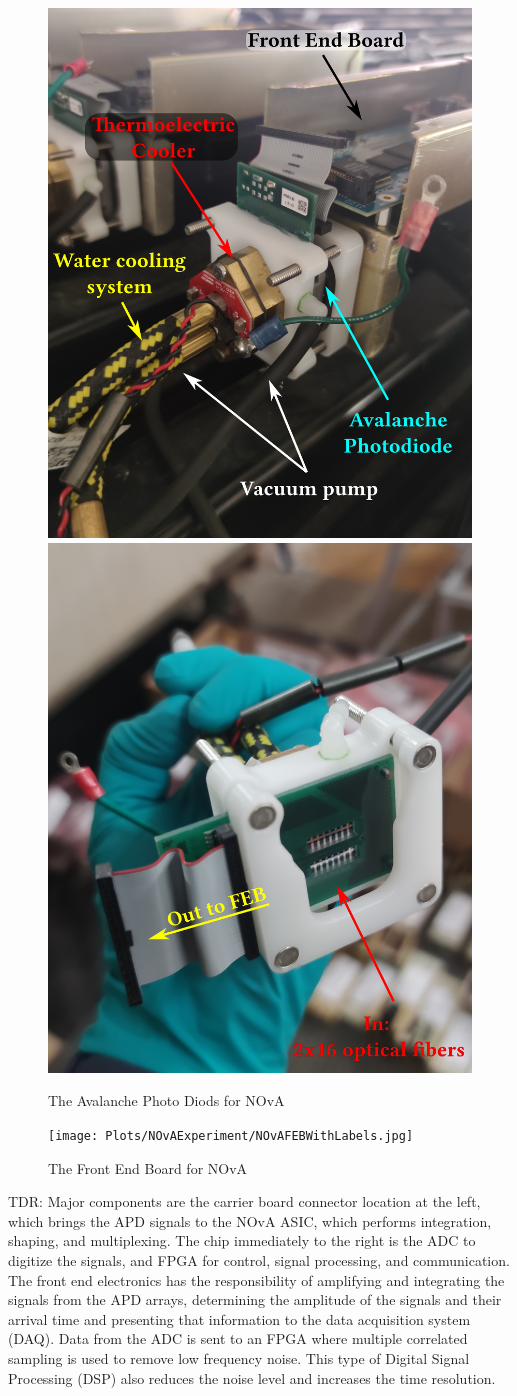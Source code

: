 \begin{figure}[!htb]  
  \centering
  \includegraphics*[width=.495\textwidth]{Plots/NOvAExperiment/NOvAAPDMountedWithLabels.jpg}
  \noindent\centering
  \includegraphics*[width=.495\textwidth]{Plots/NOvAExperiment/NOvAAPDBottomWithLabels.jpg}
  \caption[NOvA Avalanche Photo Diods]{The Avalanche Photo Diods for NOvA}
 \label{fig:NOvAAPD}
\end{figure}

\begin{figure}[!htb]  
  \centering
  \texttt{[image: Plots/NOvAExperiment/NOvAFEBWithLabels.jpg]}
  \caption[NOvA Front End Board]{The Front End Board for NOvA}
 \label{fig:NOvAAPD}
\end{figure}

TDR:
Major components are the carrier board connector location at the left, which brings the APD signals to the NOvA ASIC, which performs integration, shaping, and multiplexing. The chip immediately to the right is the ADC to digitize the signals, and FPGA for control, signal processing, and communication.
The front end electronics has the responsibility of amplifying and integrating the signals from the APD arrays, determining the amplitude of the signals and their arrival time and presenting that information to the data acquisition system (DAQ).
Data from the ADC is sent to an FPGA where multiple correlated sampling is used to remove low frequency noise. This type of Digital Signal Processing (DSP) also reduces the noise level and increases the time resolution.

